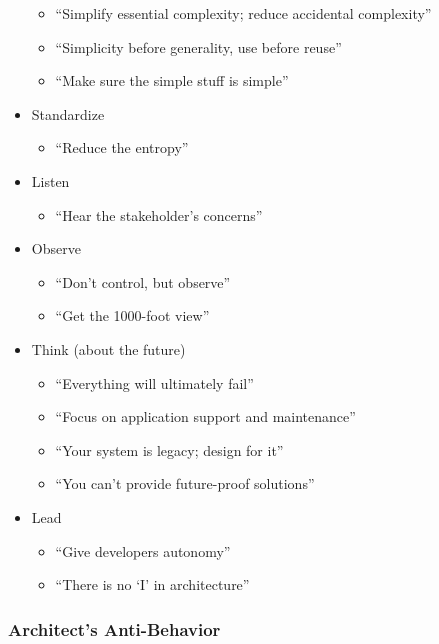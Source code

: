 \begin{itemize}
  \begin{itemize}
  \tightlist
  \item
    ``Simplify essential complexity; reduce accidental complexity''
  \item
    ``Simplicity before generality, use before reuse''
  \item
    ``Make sure the simple stuff is simple''
  \end{itemize}
\item
  Standardize

  \begin{itemize}
  \tightlist
  \item
    ``Reduce the entropy''
  \end{itemize}
\item
  Listen

  \begin{itemize}
  \tightlist
  \item
    ``Hear the stakeholder's concerns''
  \end{itemize}
\item
  Observe

  \begin{itemize}
  \tightlist
  \item
    ``Don't control, but observe''
  \item
    ``Get the 1000-foot view''
  \end{itemize}
\item
  Think (about the future)

  \begin{itemize}
  \tightlist
  \item
    ``Everything will ultimately fail''
  \item
    ``Focus on application support and maintenance''
  \item
    ``Your system is legacy; design for it''
  \item
    ``You can't provide future-proof solutions''
  \end{itemize}
\item
  Lead

  \begin{itemize}
  \tightlist
  \item
    ``Give developers autonomy''
  \item
    ``There is no `I' in architecture''
  \end{itemize}
\end{itemize}

\hypertarget{architects-anti-behavior}{%
\subsubsection{Architect's
Anti-Behavior}\label{architects-anti-behavior}}

